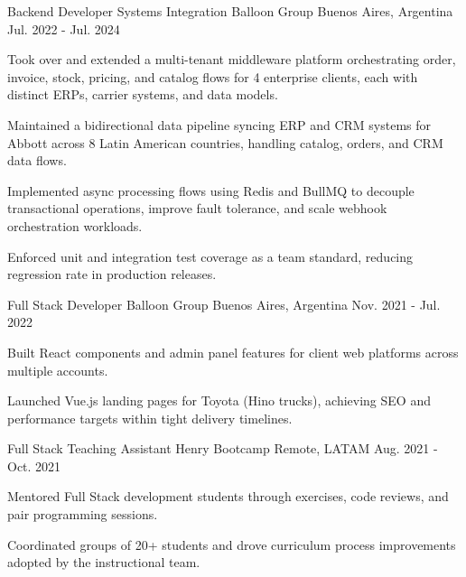 \begin{cventries}
\cventry
    {Backend Developer \textbar{} Systems Integration} %
    {Balloon Group} %
    {Buenos Aires, Argentina} %
    {Jul. 2022 - Jul. 2024} %
    {
      \begin{cvitems}
        \item {Took over and extended a multi-tenant middleware platform orchestrating order, invoice, stock, pricing, and catalog flows for 4 enterprise clients, each with distinct ERPs, carrier systems, and data models.}
        \item {Maintained a bidirectional data pipeline syncing ERP and CRM systems for Abbott across 8 Latin American countries, handling catalog, orders, and CRM data flows.}
        \item {Implemented async processing flows using Redis and BullMQ to decouple transactional operations, improve fault tolerance, and scale webhook orchestration workloads.}
        \item {Enforced unit and integration test coverage as a team standard, reducing regression rate in production releases.}
      \end{cvitems}
    }
  \vspace{9mm}
  \cventry
    {Full Stack Developer} %
    {Balloon Group} %
    {Buenos Aires, Argentina} %
    {Nov. 2021 - Jul. 2022} %
    {
      \begin{cvitems}
        \item {Built React components and admin panel features for client web platforms across multiple accounts.}
        \item {Launched Vue.js landing pages for Toyota (Hino trucks), achieving SEO and performance targets within tight delivery timelines.}
      \end{cvitems}
    }
  \vspace{9mm}
  \cventry
    {Full Stack Teaching Assistant} %
    {Henry Bootcamp} %
    {Remote, LATAM} %
    {Aug. 2021 - Oct. 2021} %
    {
      \begin{cvitems}
        \item {Mentored Full Stack development students through exercises, code reviews, and pair programming sessions.}
        \item {Coordinated groups of 20+ students and drove curriculum process improvements adopted by the instructional team.}
      \end{cvitems}
    }

\end{cventries}
